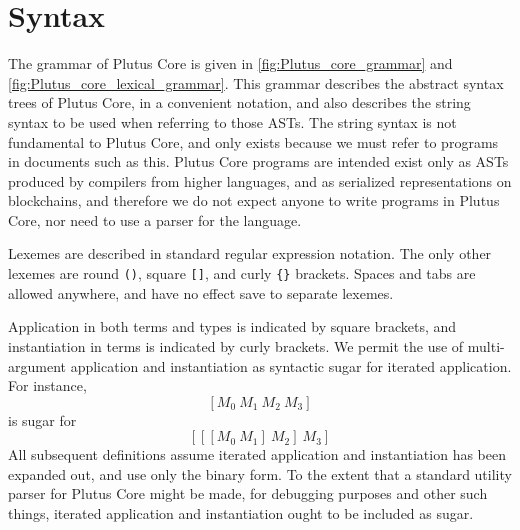 \documentclass[conference]{IEEEtran}
\newcommand{\inst}[2]{\texttt{\{}#1 ~ #2\texttt{\}}}
\newcommand{\app}[2]{\texttt{[} #1 ~ #2 \texttt{]}}
\newcommand{\appT}[2]{\texttt{[} #1 ~ #2 \texttt{]}}
\begin{document}
\section{Syntax}

The grammar of Plutus Core is given in \ref{fig:Plutus_core_grammar} and 
\ref{fig:Plutus_core_lexical_grammar}. This grammar describes the abstract
syntax trees of Plutus Core, in a convenient notation, and also describes
the string syntax to be used when referring to those ASTs. The string
syntax is not fundamental to Plutus Core, and only exists because we must
refer to programs in documents such as this. Plutus Core programs are
intended exist only as ASTs produced by compilers from higher languages,
and as serialized representations on blockchains, and therefore we do not
expect anyone to write programs in Plutus Core, nor need to use a parser
for the language.

Lexemes are described in standard regular expression notation.  The only other
lexemes are round \texttt{()}, square \texttt{[]}, and curly \texttt{\{\}}
brackets.  Spaces and tabs are allowed anywhere, and have no effect
save to separate lexemes.

Application in both terms and types is indicated by square
brackets, and instantiation in terms is indicated by curly brackets. We
permit the use of multi-argument application and instantiation as
syntactic sugar for iterated application.
For instance,
\[
  [M_0 ~ M_1 ~ M_2 ~ M_3]
\] 
is sugar for
\[
  [[[M_0 ~ M_1] ~ M_2] ~ M_3]
\]
All subsequent definitions assume iterated application and instantiation
has been expanded out, and use only the binary form. To the extent that
a standard utility parser for Plutus Core might be made, for debugging
purposes and other such things, iterated application and instantiation
ought to be included as sugar.







\end{document}
